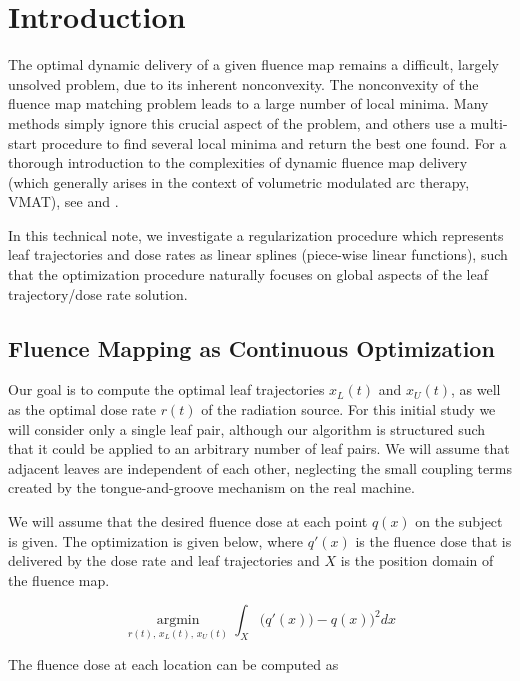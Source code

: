 \section{Introduction}
The optimal dynamic delivery of a given fluence map remains a difficult,
largely unsolved problem, due to its inherent nonconvexity.
The nonconvexity of the fluence map matching problem leads to a large number of local minima.
Many methods simply ignore this crucial aspect of the problem,
and others use a multi-start procedure to find several local minima and return the best one found.
For a thorough introduction to the complexities of dynamic fluence map delivery
(which generally arises in the context of volumetric modulated arc therapy, VMAT),
see \cite{balvertcraft} and \cite{unkvmatreview}.

In this technical note, we investigate a regularization procedure which represents
leaf trajectories and dose rates as linear splines (piece-wise linear functions),
such that the optimization procedure naturally focuses on global aspects of the leaf trajectory/dose rate solution.

\subsection{Fluence Mapping as Continuous Optimization}

Our goal is to compute the optimal leaf trajectories $x_L(t)$ and $x_U(t)$,
as well as the optimal dose rate $r(t)$ of the radiation source.
For this initial study we will consider only a single leaf pair,
although our algorithm is structured such that it could be applied to an arbitrary number of leaf pairs.
We will assume that adjacent leaves are independent of each other,
neglecting the small coupling terms created by the tongue-and-groove mechanism on the real machine.

We will assume that the desired fluence dose at each point $q(x)$ on the subject is given.
The optimization is given below, where $q'(x)$ is the fluence dose that is delivered by the
dose rate and leaf trajectories and $X$ is the position domain of the fluence map.

\begin{equation}
\underset{r(t), \, x_L(t), \, x_U(t)}{\operatorname{argmin}}
\int_X \bigg(q'(x)) - q(x)\bigg)^2 dx
\label{eqn:fluenceMapOptimization}
\end{equation}

The fluence dose at each location can be computed as

